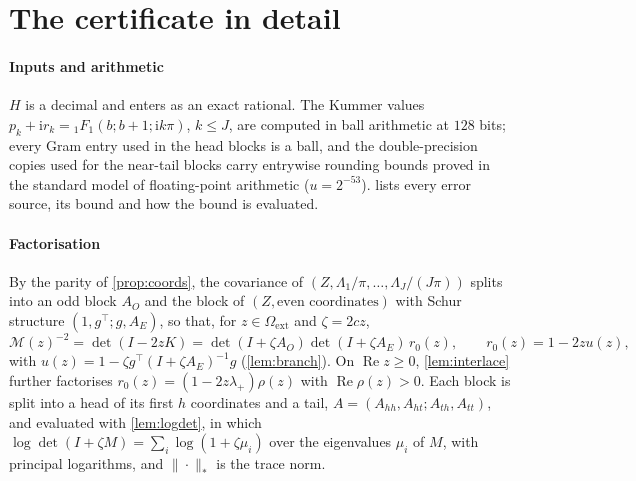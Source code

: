 \section{The \CosCert{} certificate in detail}\label{app:certificate}

\paragraph{Inputs and arithmetic} $H$ is a decimal and enters as an exact rational. The Kummer values
$p_k+\mathrm ir_k={}_1F_1(b;b+1;\mathrm ik\pi)$, $k\le J$, are computed in ball arithmetic \citep{Joh17} at $128$ bits;
every Gram entry used in the head blocks is a ball, and the double-precision copies used for the near-tail blocks carry
entrywise rounding bounds proved in the standard model of floating-point arithmetic ($u=2^{-53}$). 
lists every error source, its bound and how the bound is evaluated.

\paragraph{Factorisation} By the parity of \cref{prop:coords}, the covariance of $(Z,\Lambda_1/\pi,\dots,\Lambda_J/(J\pi))$
splits into an odd block $A_O$ and the block of $(Z,\text{even coordinates})$ with Schur structure
$(1,g^\top;g,A_E)$, so that, for $z\in\Omega_{\mathrm{ext}}$ and $\zeta=2cz$,
\[\mathcal M(z)^{-2}=\det(I-2zK)=\det(I+\zeta A_O)\det(I+\zeta A_E)\,r_0(z),\qquad r_0(z)=1-2zu(z),\]
with $u(z)=1-\zeta g^\top(I+\zeta A_E)^{-1}g$ (\cref{lem:branch}). On $\operatorname{Re}z\ge0$, \cref{lem:interlace}
further factorises $r_0(z)=(1-2z\lambda_+)\rho(z)$ with $\operatorname{Re}\rho(z)>0$. Each block is split into a head
of its first $h$ coordinates and a tail, $A=(A_{hh},A_{ht};A_{th},A_{tt})$, and evaluated with \cref{lem:logdet}, in
which $\log\det(I+\zeta M)=\sum_i\log(1+\zeta\mu_i)$ over the eigenvalues $\mu_i$ of $M$, with principal logarithms, and
$\|\cdot\|_*$ is the trace norm.

